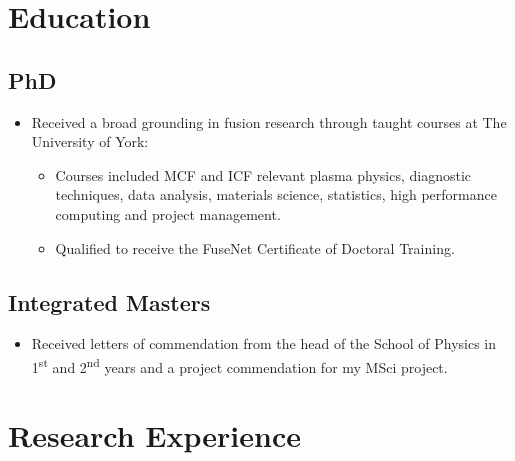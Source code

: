 \documentclass[11pt,a4paper,sans]{moderncv}        %
\begin{document}
\makecvtitle

\section{Education}
\subsection{PhD}
{\begin{itemize}%
\item Received a broad grounding in fusion research through taught courses at The University of York:%
\begin{itemize}
\item Courses included MCF and ICF relevant plasma physics, diagnostic techniques, data analysis, materials science, statistics, high performance computing and project management.
\item Qualified to receive the FuseNet Certificate of Doctoral Training.
\end{itemize}
\end{itemize}}
\subsection{Integrated Masters}
{\begin{itemize}%
\item Received letters of commendation from the head of the School of Physics in 1\textsuperscript{st} and 2\textsuperscript{nd} years and a project commendation for my MSci project.
\end{itemize}}

\section{Research Experience}
\end{document}
